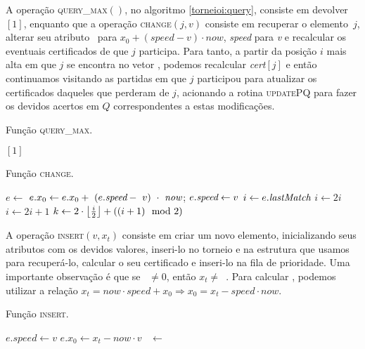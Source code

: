 A operação \textsc{query\_max}$()$, no algoritmo \ref{torneioi:query},
consiste em devolver \torneio$[1]$, enquanto que a
operação \textsc{change}$(j, v)$ consiste em recuperar o elemento~$j$,
alterar seu atributo \initv~para $x_0+(\mathit{speed}-v)\cdot now$,
\textit{speed} para \textit{v} e recalcular os eventuais
certificados de que $j$ participa. Para tanto, a partir da
posição $i$ mais alta em que $j$ se encontra no vetor \torneio,
podemos recalcular \textit{cert}$[j]$ e então continuamos visitando
as partidas em que $j$ participou para atualizar os certificados
daqueles que perderam de $j$, acionando a rotina \textsc{updatePQ}
para fazer os devidos acertos em $Q$ correspondentes a estas
modificações.
\begin{algorithm}
    \caption{Função \textsc{query\_max}.} \label{torneioi:query}
\begin{algorithmic}[1]
        \State \Return \torneio$[1]$
    \EndFunction
\end{algorithmic}
\end{algorithm}
\begin{algorithm}
    \caption{Função \textsc{change}.} \label{torneioi:change}
\begin{algorithmic}[1]
        \State $e \leftarrow$ 
        \State $e.x_0 \leftarrow e.x_0+~(e.\textit{speed} -~v)~\cdot~\textit{now}$;
        \State $e.\textit{speed} \leftarrow v$
        \State $i \leftarrow e.\textit{lastMatch}$
        \State {}
            \If{$\torneio[i] = \torneio[2i]$}
                \State $i \leftarrow 2i$
            \Else
                \State $i \leftarrow 2i + 1$
            \EndIf
            \State $k \leftarrow 2\cdot \left\lfloor \frac{i}{2} \right\rfloor
            + ((i + 1)\mod2)$ 
            \State {}
        \EndWhile
    \EndFunction
\end{algorithmic}
\end{algorithm}

A operação \textsc{insert}$(v, x_t)$ consiste em criar um novo elemento,
inicializando seus atributos com os devidos valores,
inseri-lo no torneio e na estrutura que usamos para recuperá-lo,
calcular o seu certificado e inseri-lo na fila de prioridade.
Uma importante observação é que se \now~$\neq 0$, então $x_t
\neq$~\initv. Para calcular \initv, podemos utilizar a relação
$x_t = now\cdot speed + x_0 \Rightarrow x_0 = x_t - speed\cdot
now$.
\begin{algorithm}
\caption{Função \textsc{insert}.} \label{torneioi:insert}
\begin{algorithmic}[1]
        \State $e.speed \leftarrow v$
        \State $e.x_0 \leftarrow x_t - now\cdot v$
        \State \raiz~$\leftarrow$ 
        \State {}
        \State {}
        \State {}
    \EndFunction
\end{algorithmic}
\end{algorithm}

